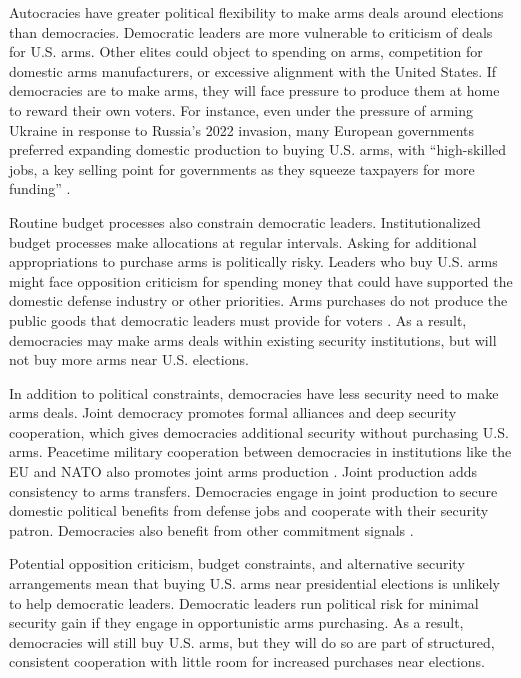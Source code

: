 \documentclass[12pt]{article}
\begin{document}
Autocracies have greater political flexibility to make arms deals around elections than democracies. 
Democratic leaders are more vulnerable to criticism of deals for U.S. arms. 
Other elites could object to spending on arms, competition for domestic arms manufacturers, or excessive alignment with the United States.
If democracies are to make arms, they will face pressure to produce them at home to reward their own voters. 
For instance, even under the pressure of arming Ukraine in response to Russia's 2022 invasion, many European governments preferred expanding domestic production to buying U.S. arms, with ``high-skilled jobs, a key selling point for governments as they squeeze taxpayers for more funding'' \citep{Meichtryetal2023}. 


Routine budget processes also constrain democratic leaders.
Institutionalized budget processes make allocations at regular intervals. 
Asking for additional appropriations to purchase arms is politically risky. 
Leaders who buy U.S. arms might face opposition criticism for spending money that could have supported the domestic defense industry or other priorities. 
Arms purchases do not produce the public goods that democratic leaders must provide for voters \citep{BDMetal2002}. 	
As a result, democracies may make arms deals within existing security institutions, but will not buy more arms near U.S. elections.


In addition to political constraints, democracies have less security need to make arms deals. 
Joint democracy promotes formal alliances and deep security cooperation, which gives democracies additional security without purchasing U.S. arms. 
Peacetime military cooperation between democracies in institutions like the EU and NATO also promotes joint arms production \citep{Klare1983, Bitzinger1994}.
Joint production adds consistency to arms transfers. 
Democracies engage in joint production to secure domestic political benefits from defense jobs and cooperate with their security patron.
Democracies also benefit from other commitment signals \citep{McManusYarhi-Milo2017}. 


Potential opposition criticism, budget constraints, and alternative security arrangements mean that buying U.S. arms near presidential elections is unlikely to help democratic leaders.
Democratic leaders run political risk for minimal security gain if they engage in opportunistic arms purchasing. 
As a result, democracies will still buy U.S. arms, but they will do so are part of structured, consistent cooperation with little room for increased purchases near elections. 
\end{document}
